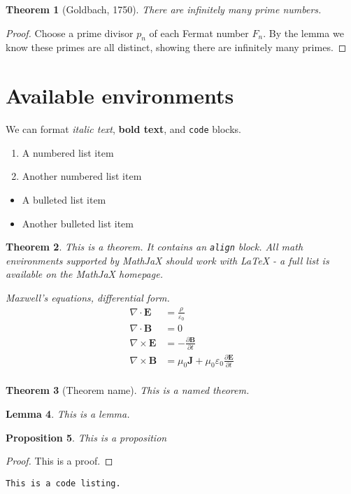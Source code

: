 \documentclass[12pt]{amsart}
\theoremstyle{plain}%
\newtheorem{thm}{Theorem}[section]
\newtheorem{lem}[thm]{Lemma}
\newtheorem{prop}[thm]{Proposition}
\begin{document}
\begin{thm}[Goldbach, 1750]
    There are infinitely many prime numbers.
\end{thm}

\begin{proof}
    Choose a prime divisor $p_n$ of each Fermat number $F_n$.  By the lemma we know these primes are all distinct, showing there are infinitely many primes.
\end{proof}

\section{Available environments}

We can format \emph{italic text}, \textbf{bold text}, and \texttt{code} blocks.

\begin{enumerate}
    \item A numbered list item
    \item Another numbered list item
\end{enumerate}

\begin{itemize}
    \item A bulleted list item
    \item Another bulleted list item
\end{itemize}

\begin{thm}
    This is a theorem.  It contains an \texttt{align} block.  All math environments supported by MathJaX should work with LaTeX - a full list is available on the MathJaX homepage.
    
    Maxwell's equations, differential form.
    \begin{align*}
        \nabla \cdot \mathbf{E} &= \frac {\rho} {\varepsilon_0} \\
        \nabla \cdot \mathbf{B} &= 0 \\
        \nabla \times \mathbf{E} &= -\frac{\partial \mathbf{B}} {\partial t} \\
        \nabla \times \mathbf{B} &= \mu_0 \mathbf{J} + \mu_0 \varepsilon_0 \frac{\partial \mathbf{E}} {\partial t} \\
    \end{align*}
\end{thm}

\begin{thm}[Theorem name]
    This is a named theorem.
\end{thm}

\begin{lem}
    This is a lemma.
\end{lem}

\begin{prop}
    This is a proposition
\end{prop}

\begin{proof}
    This is a proof.
\end{proof}

\begin{lstlisting}
This is a code listing.
\end{lstlisting}
\end{document}

